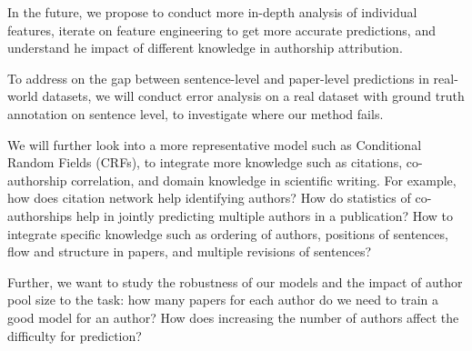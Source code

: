 
In the future, we propose to conduct more in-depth analysis of
individual features, iterate on feature engineering to get more
accurate predictions, and understand he impact of different knowledge
in authorship attribution.

To address on the gap between sentence-level and paper-level
predictions in real-world datasets, we will conduct error analysis on
a real dataset with ground truth annotation on sentence level, to
investigate where our method fails.

We will further look into a more representative model such as
Conditional Random Fields (CRFs), to integrate more knowledge such as
citations, co-authorship correlation, and domain knowledge in
scientific writing. For example, how does citation network help
identifying authors? How do statistics of co-authorships help in
jointly predicting multiple authors in a publication? How to integrate
specific knowledge such as ordering of authors, positions of
sentences, flow and structure in papers, and multiple revisions of
sentences?

Further, we want to study the robustness of our models and the impact
of author pool size to the task: how many papers for each author do we
need to train a good model for an author? How does increasing the
number of authors affect the difficulty for prediction?
